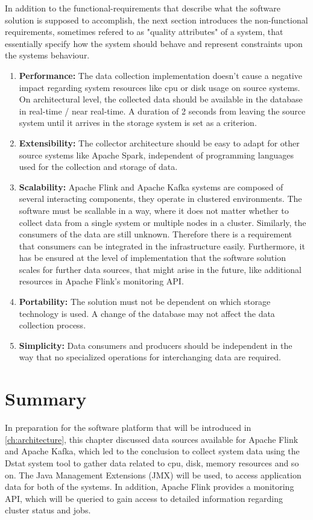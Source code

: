 In addition to the functional-requirements that describe what the software solution is supposed
to accomplish, the next section introduces the non-functional requirements, sometimes refered to as
"quality attributes" of a system, that essentially specify how the system should behave and represent
constraints upon the systems behaviour.

\begin{enumerate}
    \item \textbf{Performance:} The data collection implementation doesn't cause a negative impact regarding
    system resources like cpu or disk usage on source systems. On architectural level, the collected data should be
    available in the database in real-time / near real-time. A duration of 2 seconds from leaving the source system until
    it arrives in the storage system is set as a criterion.

    \item \textbf{Extensibility:} The collector architecture should be easy to adapt for other source systems
    like Apache Spark, independent of programming languages used for the collection and storage of data.

    \item \textbf{Scalability:} Apache Flink and Apache Kafka systems are composed of several interacting components, they
    operate in clustered environments. The software must be scallable in a way, where it does not matter whether to collect
    data from a single system or multiple nodes in a cluster. Similarly, the consumers of the data are still unknown. Therefore
    there is a requirement that consumers can be integrated in the infrastructure easily.
    Furthermore, it has be ensured at the level of implementation that the software solution scales for further data sources,
    that might arise in the future, like additional resources in Apache Flink's monitoring API.

    \item \textbf{Portability:} The solution must not be dependent on which storage technology is used. A change of the
    database may not affect the data collection process.

    \item \textbf{Simplicity:} Data consumers and producers should be independent in the way that no specialized operations
    for interchanging data are required.
\end{enumerate}

\section{Summary}

In preparation for the software platform that will be introduced in \autoref{ch:architecture}, this chapter discussed
data sources available for Apache Flink and Apache Kafka, which led to the conclusion to collect system data using the Dstat
system tool to gather data related to cpu, disk, memory resources and so on. The Java Management Extensions (JMX) will be used,
to access application data for both of the systems. In addition, Apache Flink provides a monitoring API, which will be
queried to gain access to detailed information regarding cluster status and jobs.